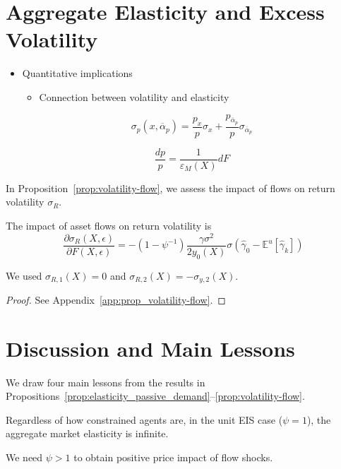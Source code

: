 \section{Aggregate Elasticity and Excess Volatility}
\begin{itemize}
	\item Quantitative implications
	\begin{itemize}
		\item Connection between volatility and elasticity
	\end{itemize}
	
	\begin{equation}
		\sigma_p(x,\overline{\alpha}_p) = \frac{p_x}{p} \sigma_x + \frac{p_{\overline{\alpha}_p}}{p} \sigma_{\overline{\alpha}_p}
	\end{equation}
	
	
	\begin{equation}
		\frac{d p}{p} = \frac{1}{\varepsilon_M(X)} dF
	\end{equation}
	
\end{itemize}
In Proposition~\ref{prop:volatility-flow}, we assess the impact of flows on return volatility $ \sigma_{R} $.
\begin{prop}\label{prop:volatility-flow}
	The impact of asset flows on return volatility is
	\begin{equation}\label{eq:volatility-flow}
		\frac{\partial\sigma_{R}(X,\epsilon)}{\partial F(X,\epsilon)}=-\left(1-\psi^{-1}\right) \frac{\gamma \sigma^{2}}{2 y_{0}(X)}\sigma\left(\hat{\gamma}_{0}-\mathbb{E}^{u}\left[\hat{\gamma}_{k}\right]\right)
	\end{equation}
\end{prop}
We used $ \sigma_{R,1}(X)=0 $ and $ \sigma_{R,2}(X)=-\sigma_{y,2}(X). $
\begin{proof}
	See Appendix~\ref{app:prop_volatility-flow}.
\end{proof}

\section{Discussion and Main Lessons}
We draw four main lessons from the results in Propositions~\ref{prop:elasticity_passive_demand}--\ref{prop:volatility-flow}.
\begin{lesson}
	Regardless of how constrained agents are, in the unit EIS case ($ \psi=1 $), the aggregate market elasticity is infinite. 
\end{lesson}
We need $ \psi>1 $ to obtain positive price impact of flow shocks.

